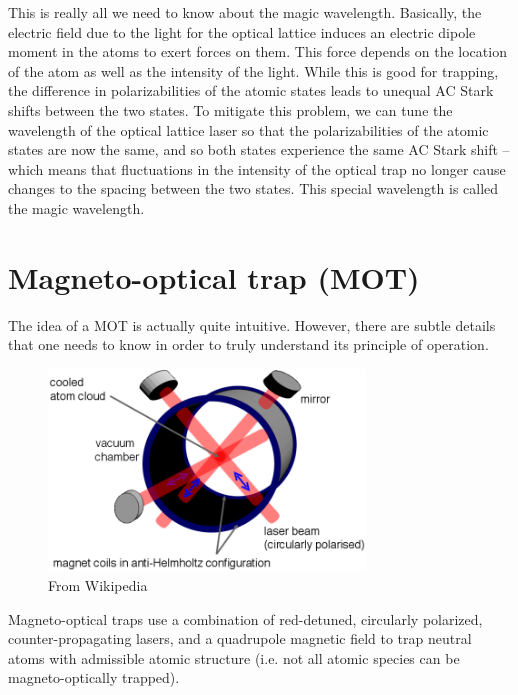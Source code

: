 \documentclass{book}
\theoremstyle{definition}
\begin{document}
This is really all we need to know about the magic wavelength. Basically, the electric field due to the light for the optical lattice induces an electric dipole moment in the atoms to exert forces on them. This force depends on the location of the atom as well as the intensity of the light. While this is good for trapping, the difference in polarizabilities of the atomic states leads to unequal AC Stark shifts between the two states. To mitigate this problem, we can tune the wavelength of the optical lattice laser so that the polarizabilities of the atomic states are now the same, and so both states experience the same AC Stark shift -- which means that fluctuations in the intensity of the optical trap no longer cause changes to the spacing between the two states. This special wavelength is called the magic wavelength. 









\section*{Magneto-optical trap (MOT)}

The idea of a MOT is actually quite intuitive. However, there are subtle details that one needs to know in order to truly understand its principle of operation. 

\begin{figure}[!htb]
	\centering
	\includegraphics[width=0.75\textwidth]{images/MOT}
	\caption{From Wikipedia}
\end{figure}

Magneto-optical traps use a combination of red-detuned, circularly polarized, counter-propagating lasers, and a quadrupole magnetic field to trap neutral atoms with admissible atomic structure (i.e. not all atomic species can be magneto-optically trapped). \\
\end{document}
